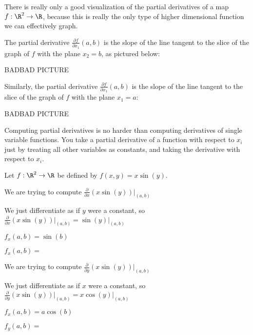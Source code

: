 \documentclass{ximera}
\begin{document}
	\begin{example}
		There is really only a good visualization of the partial derivatives of a map  $f: \R^2 \to \R$, 
		because this is really the only type of higher dimensional function we can effectively graph.
		
		The partial derivative $\frac{\partial f}{\partial x_1} \left(a,b\right)$ is the slope of the line tangent to the slice of the graph of $f$ with the
		plane $x_2 = b$, as pictured below:
		
		BADBAD PICTURE
		
		Similarly, the partial derivative  $\frac{\partial f}{\partial x_1} \left(a,b\right)$ is the slope of the line tangent to the slice of the graph of $f$ with the
		plane $x_1=a$:
		
		BADBAD PICTURE
		
	\end{example}
	
	Computing partial derivatives is no harder than computing derivatives of single variable functions.  You take a 
	 partial derivative of a function with respect to $x_i$ just by treating all other variables as constants, and taking the derivative with respect to $x_i$.
	
	\begin{question}
		
	Let $f:\R^2 \to \R$ be defined by $f(x,y) = x\sin(y)$.  
	\begin{solution}
		\begin{hint}
			We are trying to compute $\frac{\partial}{\partial x} \left(x \sin(y)\right)\big|_{(a,b)}$
		\end{hint}
		\begin{hint}
			We just differentiate as if $y$ were a constant, so 
			 $\frac{\partial}{\partial x} \left(x \sin(y)\right)\big|_{(a,b)} = \sin(y)\big|_{(a,b)}$
		\end{hint}
		\begin{hint}
			$f_x(a,b) = \sin(b)$
		\end{hint}
		$f_x(a,b) = $ 
	\end{solution}
	
	\begin{solution}
	\begin{hint}
			We are trying to compute $\frac{\partial}{\partial y} \left(x \sin(y)\right)\big|_{(a,b)}$
		\end{hint}
		\begin{hint}
			We just differentiate as if $x$ were a constant, so 
			 $\frac{\partial}{\partial y} \left(x \sin(y)\right)\big|_{(a,b)} = x\cos(y)\big|_{(a,b)}$
		\end{hint}
		\begin{hint}
			$f_x(a,b) = a\cos(b)$
		\end{hint}
		$f_y(a,b) = $ \answer{$a(cos(b))$}
	\end{solution}
	
	\end{question}
	
\end{document}
